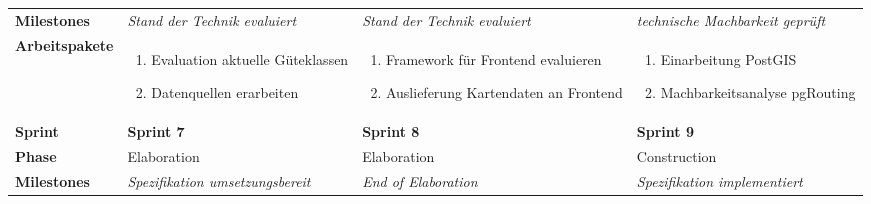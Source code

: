 \begin{landscape}
\begin{longtable}{l p{5.5cm} p{5.5cm} p{5.5cm}}
        \textbf{Milestones}
                                & \textit{Stand der Technik evaluiert}
                                & \textit{Stand der Technik evaluiert}
                                & \textit{technische Machbarkeit geprüft}  \\

        \textbf{Arbeitspakete}
                                & \begin{enumerate}[noitemsep]
                                    \item Evaluation aktuelle Güteklassen
                                    \item Datenquellen erarbeiten
                                \end{enumerate}
                                & \begin{enumerate}[noitemsep]
                                    \item Framework für Frontend evaluieren
                                    \item Auslieferung Kartendaten an Frontend
                                \end{enumerate}
                                & \begin{enumerate}[noitemsep]
                                    \item Einarbeitung PostGIS
                                    \item Machbarkeitsanalyse pgRouting
                                \end{enumerate}  \\

        \pagebreak
        \toprule
        \textbf{Sprint}
                                & \textbf{Sprint 7}
                                & \textbf{Sprint 8}
                                & \textbf{Sprint 9} \\

        \midrule
        \textbf{Phase}
                                & Elaboration
                                & Elaboration
                                & Construction \\

        \textbf{Milestones}
                                & \textit{Spezifikation umsetzungsbereit}
                                & \textit{End of Elaboration}
                                & \textit{Spezifikation implementiert}  \\


\end{longtable}
\end{landscape}
